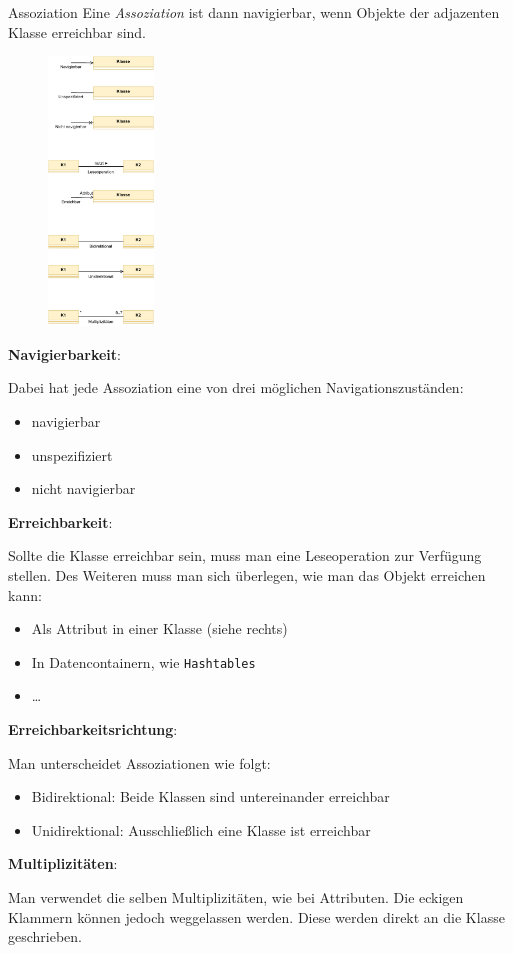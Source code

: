 \begin{diag}{Assoziation}
    Eine \emph{Assoziation} ist dann navigierbar, wenn Objekte der adjazenten Klasse erreichbar sind.

    \begin{figure}
        \centering
        \includegraphics[width=0.25\textwidth]{includes/figures/defi_diagrams_class_assoziation.pdf}
    \end{figure}
    \textbf{Navigierbarkeit}:

    Dabei hat jede Assoziation eine von drei möglichen Navigationszuständen:
    \begin{itemize}
        \item navigierbar
        \item unspezifiziert
        \item nicht navigierbar
    \end{itemize}

    \textbf{Erreichbarkeit}:

    Sollte die Klasse erreichbar sein, muss man eine Leseoperation zur Verfügung stellen.
    Des Weiteren muss man sich überlegen, wie man das Objekt erreichen kann:
    \begin{itemize}
        \item Als Attribut in einer Klasse (siehe rechts)
        \item In Datencontainern, wie \texttt{Hashtables}
        \item \ldots
    \end{itemize}

    \textbf{Erreichbarkeitsrichtung}:

    Man unterscheidet Assoziationen wie folgt:
    \begin{itemize}
        \item Bidirektional: Beide Klassen sind untereinander erreichbar
        \item Unidirektional: Ausschließlich eine Klasse ist erreichbar
    \end{itemize}

    \textbf{Multiplizitäten}:

    Man verwendet die selben Multiplizitäten, wie bei Attributen.
    Die eckigen Klammern können jedoch weggelassen werden.
    Diese werden direkt an die Klasse geschrieben.
\end{diag}

